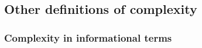 %
%
%
%

\subsection{Other definitions of complexity}


\subsubsection{Complexity in informational terms}

